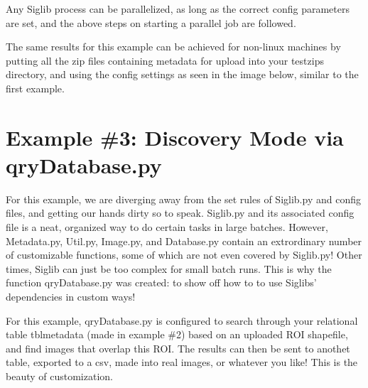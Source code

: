 \documentclass[letterpaper,10pt,openany,oneside]{sphinxmanual}
\begin{document}
Any Siglib process can be parallelized, as long as the correct config parameters
are set, and the above steps on starting a parallel job are followed.

The same results for this example can be achieved for non-linux machines by
putting all the zip files containing metadata for upload into your testzips directory,
and using the config settings as seen in the image below, similar to the first example.


\section{Example \#3: Discovery Mode via qryDatabase.py}
\label{tutorial:example-3-discovery-mode-via-qrydatabase-py}
For this example, we are diverging away from the set rules of Siglib.py and
config files, and getting our hands dirty so to speak. Siglib.py and its associated
config file is a neat, organized way to do certain tasks in large batches. However,
Metadata.py, Util.py, Image.py, and Database.py contain an extrordinary number of
customizable functions, some of which are not even covered by Siglib.py! Other times,
Siglib can just be too complex for small batch runs. This is why the function
qryDatabase.py was created: to show off how to to use Siglibs' dependencies in
custom ways!

For this example, qryDatabase.py is configured to search through your relational
table tblmetadata (made in example \#2) based on an uploaded ROI shapefile, and find
images that overlap this ROI. The results can then be sent to anothet table, exported to
a csv, made into real images, or whatever you like! This is the beauty of customization.
\end{document}
